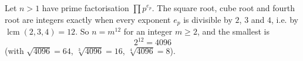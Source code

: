 Let $n>1$ have prime factorisation $\prod p^{e_p}$. The square root, cube root and fourth root are integers exactly when every exponent $e_p$ is divisible by $2$, $3$ and $4$, i.e. by $\operatorname{lcm}(2,3,4)=12$. So $n=m^{12}$ for an integer $m\ge2$, and the smallest is
\[
2^{12}=\boxed{4096}
\]
(with $\sqrt{4096}=64$, $\sqrt[3]{4096}=16$, $\sqrt[4]{4096}=8$).
